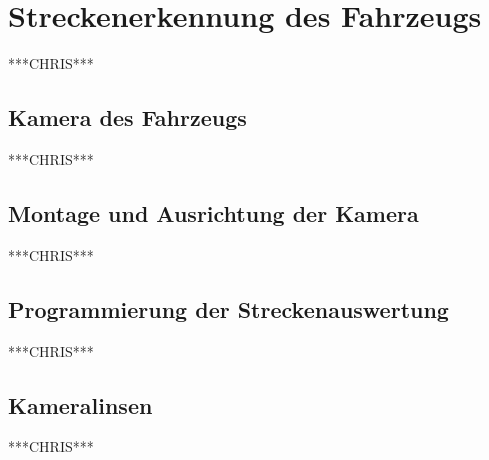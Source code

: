 

\pagestyle{fancy}
\rhead{\thepage} \chead{} 
\cfoot{}

\section{Streckenerkennung des Fahrzeugs}\label{Sec7}
***CHRIS***

\subsection{Kamera des Fahrzeugs}\label{Sec7Sub1}
***CHRIS***

\subsection{Montage und Ausrichtung der Kamera}\label{Sec7Sub2}
***CHRIS***

\subsection{Programmierung der Streckenauswertung}\label{Sec7Sub3}
***CHRIS***

\subsection{Kameralinsen}\label{Sec7Sub4}
***CHRIS***

\newpage
